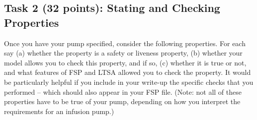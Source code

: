\documentclass{article}
\newcommand{\head}{\subsection*}
\begin{document}
\head{Task 2 (32 points): Stating and Checking Properties}

Once you have your pump specified, consider the following properties. For each say (a) whether the property
is a safety or liveness property,  (b) whether your model allows you to check this property, and if
so, (c) whether it is true or not, and what features of FSP and LTSA allowed you to check the
property. It would be particularly helpful if you include in your write-up the specific checks that you performed -- which should also appear in your FSP file. (Note: not all of these properties have to be true of your pump, depending on how you interpret the requirements for an infusion pump.)
\end{document}
